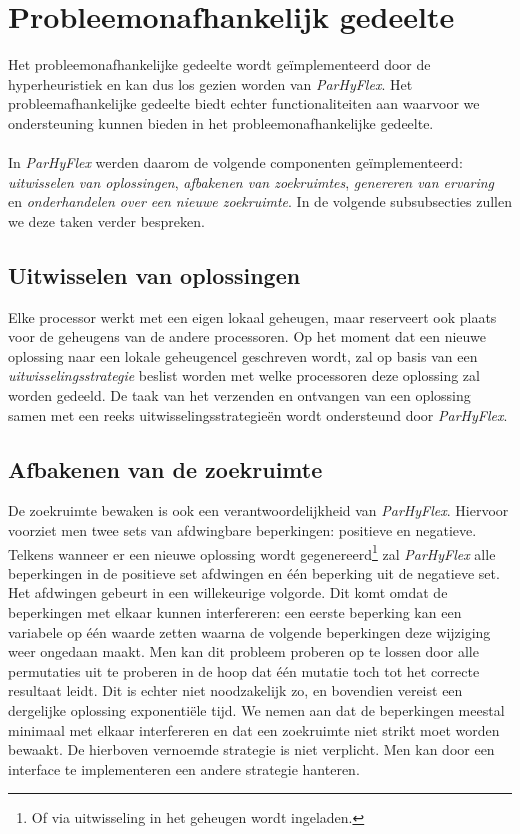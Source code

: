 \section{Probleemonafhankelijk gedeelte}

Het probleemonafhankelijke gedeelte wordt ge\"implementeerd door de hyperheuristiek en kan dus los gezien worden van \emph{ParHyFlex}. Het probleemafhankelijke gedeelte biedt echter functionaliteiten aan waarvoor we ondersteuning kunnen bieden in het probleemonafhankelijke gedeelte.

\paragraph{}
In \emph{ParHyFlex} werden daarom de volgende componenten ge\"implementeerd: \emph{uitwisselen van oplossingen}, \emph{afbakenen van zoekruimtes}, \emph{genereren van ervaring} en \emph{onderhandelen over een nieuwe zoekruimte}. In de volgende subsubsecties zullen we deze taken verder bespreken.

\subsection{Uitwisselen van oplossingen}

Elke processor werkt met een eigen lokaal geheugen, maar reserveert ook plaats voor de geheugens van de andere processoren. Op het moment dat een nieuwe oplossing naar een lokale geheugencel geschreven wordt, zal op basis van een \emph{uitwisselingsstrategie} beslist worden met welke processoren deze oplossing zal worden gedeeld. De taak van het verzenden en ontvangen van een oplossing samen met een reeks uitwisselingsstrategie\"en wordt ondersteund door \emph{ParHyFlex}.

\subsection{Afbakenen van de zoekruimte}
 
De zoekruimte bewaken is ook een verantwoordelijkheid van \emph{ParHyFlex}. Hiervoor voorziet men twee sets van afdwingbare beperkingen: positieve en negatieve. Telkens wanneer er een nieuwe oplossing wordt gegenereerd\footnote{Of via uitwisseling in het geheugen wordt ingeladen.} zal \emph{ParHyFlex} alle beperkingen in de positieve set afdwingen en \'e\'en beperking uit de negatieve set. Het afdwingen gebeurt in een willekeurige volgorde. Dit komt omdat de beperkingen met elkaar kunnen interfereren: een eerste beperking kan een variabele op \'e\'en waarde zetten waarna de volgende beperkingen deze wijziging weer ongedaan maakt. Men kan dit probleem proberen op te lossen door alle permutaties uit te proberen in de hoop dat \'e\'en mutatie toch tot het correcte resultaat leidt. Dit is echter niet noodzakelijk zo, en bovendien vereist een dergelijke oplossing exponenti\"ele tijd. We nemen aan dat de beperkingen meestal minimaal met elkaar interfereren en dat een zoekruimte niet strikt moet worden bewaakt. De hierboven vernoemde strategie is niet verplicht. Men kan door een interface te implementeren een andere strategie hanteren.


